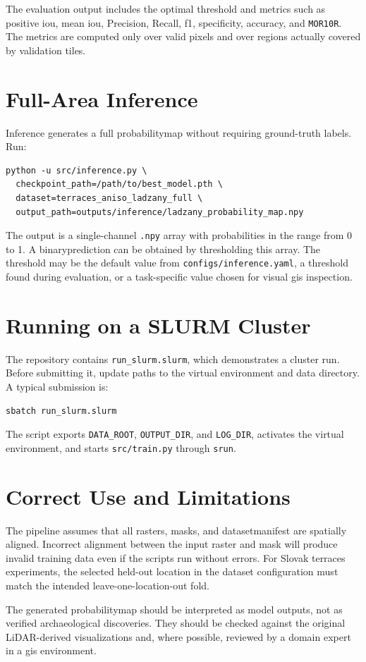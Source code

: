 \begin{sloppypar}
The evaluation output includes the optimal threshold and metrics such as positive \gls{iou}, mean \gls{iou}, Precision, Recall, \gls{f1}, specificity, accuracy, and \texttt{MOR10R}. The metrics are computed only over valid pixels and over regions actually covered by validation tiles.

\section{Full-Area Inference}

Inference generates a full \gls{probabilitymap} without requiring ground-truth labels. Run:

\begin{verbatim}
python -u src/inference.py \
  checkpoint_path=/path/to/best_model.pth \
  dataset=terraces_aniso_ladzany_full \
  output_path=outputs/inference/ladzany_probability_map.npy
\end{verbatim}

The output is a single-channel \texttt{.npy} array with probabilities in the range from 0 to 1. A \gls{binaryprediction} can be obtained by thresholding this array. The threshold may be the default value from \texttt{configs/inference.yaml}, a threshold found during evaluation, or a task-specific value chosen for visual \gls{gis} inspection.

\section{Running on a SLURM Cluster}

The repository contains \texttt{run\_slurm.slurm}, which demonstrates a cluster run. Before submitting it, update paths to the virtual environment and data directory. A typical submission is:

\begin{verbatim}
sbatch run_slurm.slurm
\end{verbatim}

The script exports \texttt{DATA\_ROOT}, \texttt{OUTPUT\_DIR}, and \texttt{LOG\_DIR}, activates the virtual environment, and starts \texttt{src/train.py} through \texttt{srun}.

\section{Correct Use and Limitations}

The pipeline assumes that all rasters, masks, and \gls{datasetmanifest} are spatially aligned. Incorrect alignment between the input raster and mask will produce invalid training data even if the scripts run without errors. For Slovak terraces experiments, the selected held-out location in the dataset configuration must match the intended leave-one-location-out fold.

The generated \gls{probabilitymap} should be interpreted as model outputs, not as verified archaeological discoveries. They should be checked against the original LiDAR-derived visualizations and, where possible, reviewed by a domain expert in a \gls{gis} environment.

\end{sloppypar}

